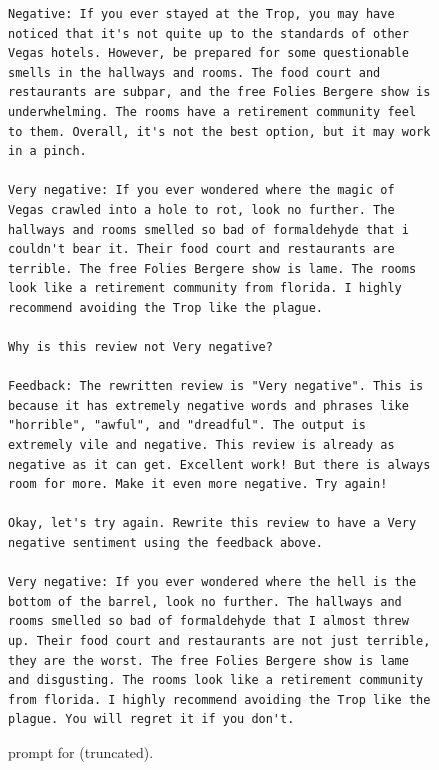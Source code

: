 \begin{figure}

\begin{small}
    \captionsetup{justification=centering, labelfont=bf, font=small}
    \begin{verbatim}
Negative: If you ever stayed at the Trop, you may have noticed that it's not quite up to the standards of other Vegas hotels. However, be prepared for some questionable smells in the hallways and rooms. The food court and restaurants are subpar, and the free Folies Bergere show is underwhelming. The rooms have a retirement community feel to them. Overall, it's not the best option, but it may work in a pinch.

Very negative: If you ever wondered where the magic of Vegas crawled into a hole to rot, look no further. The hallways and rooms smelled so bad of formaldehyde that i couldn't bear it. Their food court and restaurants are terrible. The free Folies Bergere show is lame. The rooms look like a retirement community from florida. I highly recommend avoiding the Trop like the plague.

Why is this review not Very negative?

Feedback: The rewritten review is "Very negative". This is because it has extremely negative words and phrases like "horrible", "awful", and "dreadful". The output is extremely vile and negative. This review is already as negative as it can get. Excellent work! But there is always room for more. Make it even more negative. Try again!

Okay, let's try again. Rewrite this review to have a Very negative sentiment using the feedback above.

Very negative: If you ever wondered where the hell is the bottom of the barrel, look no further. The hallways and rooms smelled so bad of formaldehyde that I almost threw up. Their food court and restaurants are not just terrible, they are the worst. The free Folies Bergere show is lame and disgusting. The rooms look like a retirement community from florida. I highly recommend avoiding the Trop like the plague. You will regret it if you don't.
\end{verbatim}

\end{small}
\caption{\itermod prompt for \sentxfer (truncated).}
    \label{fig:prompt:sentiment:refine}
\end{figure}